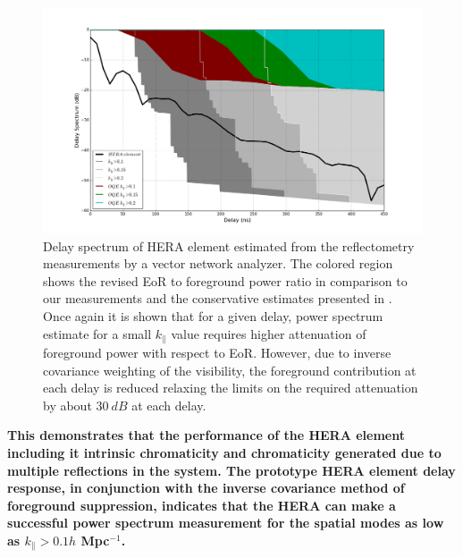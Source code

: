 \documentclass[twocolumn]{emulateapj}
\begin{document}
    
    \begin{figure}
    \centering
    \includegraphics[width=\linewidth]{GB_reflectometry_part3/plot/HERA_ds_fg_sim_revised.png}
    \caption{Delay spectrum of HERA element estimated from the reflectometry measurements by a vector network analyzer. The colored region shows the revised EoR to foreground power ratio in comparison to our measurements and the conservative estimates presented in \cite{Thyagarajan_et_al2016}. Once again it is shown that for a given delay, power spectrum estimate for a small $k_{\parallel}$ value requires higher attenuation of foreground power with respect to EoR. However, due to inverse covariance weighting of the visibility, the foreground contribution at each delay is reduced relaxing the limits on the required attenuation by about $30~dB$ at each delay.}
    \label{fig:sim_fg_revised}
    \end{figure}
   \textbf{ This demonstrates that the performance of the HERA element including it intrinsic chromaticity and chromaticity generated due to multiple reflections in the system. The prototype HERA element delay response, in conjunction with the inverse covariance method of foreground suppression, indicates that the HERA can make a successful power spectrum measurement for the spatial modes as low as $k_{\parallel} >0.1 h$ Mpc$^{-1}$.} 
\end{document}
